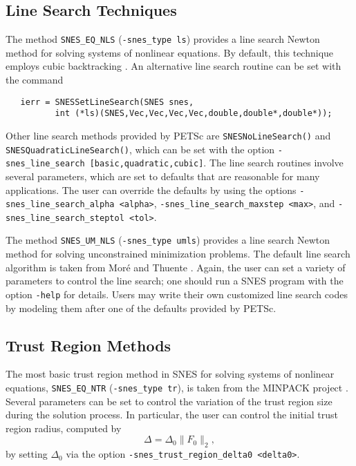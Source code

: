 \subsection{Line Search Techniques} 

The method {\tt SNES\_EQ\_NLS} ({\tt -snes\_type ls}) provides a line
search Newton method for solving systems of nonlinear equations.  By
default, this technique employs cubic backtracking \cite{dennis:83}.
An alternative line search routine can be set with the command
\begin{verbatim}
   ierr = SNESSetLineSearch(SNES snes,
          int (*ls)(SNES,Vec,Vec,Vec,Vec,double,double*,double*));
\end{verbatim}
Other line search methods provided by PETSc are 
{\tt SNESNoLineSearch()} 
and {\tt SNESQuadraticLineSearch()}, 
which can be set with the option
{\tt -snes\_line\_search [basic,quadratic,cubic]}. 
The line search routines involve several parameters, which are set
to defaults that are reasonable for many applications.  The user
can override the defaults by using the options
{\tt -snes\_line\_search\_alpha <alpha>}, 
{\tt -snes\_line\_search\_maxstep <max>}, and 
{\tt -snes\_line\_search\_steptol <tol>}. 

The method {\tt SNES\_UM\_NLS} ({\tt -snes\_type umls}) provides a line
search Newton method for solving unconstrained minimization problems.
The default line search algorithm is taken from Mor\'{e} and Thuente
\cite{more:92}.  Again, the user can set a variety of parameters to
control the line search; one should run a SNES program with the option {\tt -help}
for details.  Users may write their own customized line search codes
by modeling them after one of the defaults provided by PETSc.

\subsection{Trust Region Methods}

The most basic trust region method in SNES for solving systems of nonlinear
equations, {\tt SNES\_EQ\_NTR} ({\tt-snes\_type tr}), is taken from
the MINPACK project \cite{more84}. Several parameters can be set to
control the variation of the trust region size during the solution
process.  In particular, the user can control the initial trust region
radius, computed by
\[
  \Delta = \Delta_0 \| F_0 \|_2,
\]
by setting $\Delta_0$ via the option 
{\tt -snes\_trust\_region\_delta0 <delta0>}.

